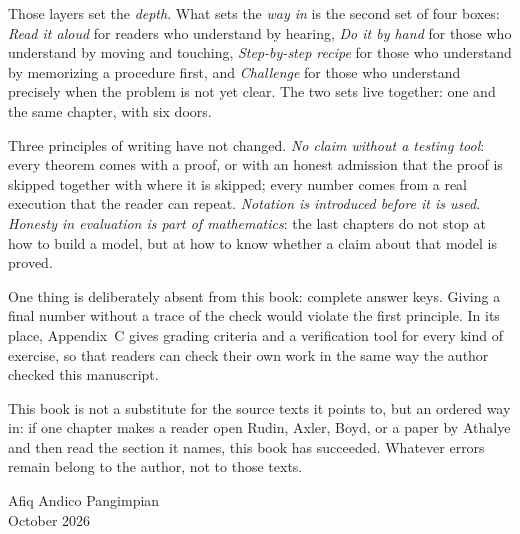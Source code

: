 Those layers set the \emph{depth}. What sets the \emph{way in} is the second set of four
boxes: \emph{Read it aloud} for readers who understand by hearing, \emph{Do it by hand}
for those who understand by moving and touching, \emph{Step-by-step recipe} for those who
understand by memorizing a procedure first, and \emph{Challenge} for those who understand
precisely when the problem is not yet clear. The two sets live together: one and the same
chapter, with six doors.

Three principles of writing have not changed. \emph{No claim without a testing tool}:
every theorem comes with a proof, or with an honest admission that the proof is skipped
together with where it is skipped; every number comes from a real execution that the
reader can repeat. \emph{Notation is introduced before it is used}. \emph{Honesty in
evaluation is part of mathematics}: the last chapters do not stop at how to build a
model, but at how to know whether a claim about that model is proved.

One thing is deliberately absent from this book: complete answer keys. Giving a final
number without a trace of the check would violate the first principle. In its place,
Appendix~C gives grading criteria and a verification tool for every kind of exercise, so
that readers can check their own work in the same way the author checked this manuscript.

This book is not a substitute for the source texts it points to, but an ordered way in:
if one chapter makes a reader open Rudin, Axler, Boyd, or a paper by Athalye and then
read the section it names, this book has succeeded. Whatever errors remain belong to the
author, not to those texts.

\enlargethispage{3\baselineskip}
\vspace{0.35cm}
\begin{flushright}
Afiq Andico Pangimpian\\
October 2026
\end{flushright}
